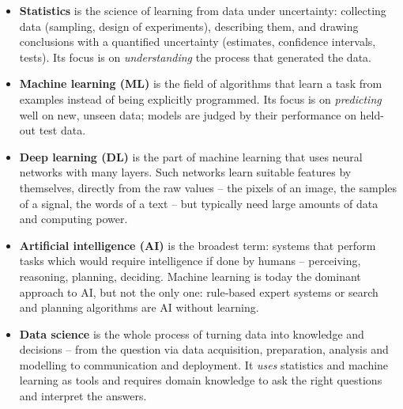 \documentclass[
  letterpaper,
  DIV=11,
  numbers=noendperiod]{scrreprt}
\providecommand{\tightlist}{%
  \setlength{\itemsep}{0pt}\setlength{\parskip}{0pt}}\usepackage{longtable,booktabs,array}
\begin{document}
\begin{tcolorbox}[enhanced jigsaw, left=2mm, title=\textcolor{quarto-callout-note-color}{\faInfo}\hspace{0.5em}{Working definitions used in this course}, opacityback=0, breakable, rightrule=.15mm, arc=.35mm, toptitle=1mm, colbacktitle=quarto-callout-note-color!10!white, opacitybacktitle=0.6, coltitle=black, colframe=quarto-callout-note-color-frame, bottomrule=.15mm, leftrule=.75mm, bottomtitle=1mm, titlerule=0mm, toprule=.15mm, colback=white]

\begin{itemize}
\tightlist
\item
  \textbf{Statistics} is the science of learning from data under
  uncertainty: collecting data (sampling, design of experiments),
  describing them, and drawing conclusions with a quantified uncertainty
  (estimates, confidence intervals, tests). Its focus is on
  \emph{understanding} the process that generated the data.
\item
  \textbf{Machine learning (ML)} is the field of algorithms that learn a
  task from examples instead of being explicitly programmed. Its focus
  is on \emph{predicting} well on new, unseen data; models are judged by
  their performance on held-out test data.
\item
  \textbf{Deep learning (DL)} is the part of machine learning that uses
  neural networks with many layers. Such networks learn suitable
  features by themselves, directly from the raw values -- the pixels of
  an image, the samples of a signal, the words of a text -- but
  typically need large amounts of data and computing power.
\item
  \textbf{Artificial intelligence (AI)} is the broadest term: systems
  that perform tasks which would require intelligence if done by humans
  -- perceiving, reasoning, planning, deciding. Machine learning is
  today the dominant approach to AI, but not the only one: rule-based
  expert systems or search and planning algorithms are AI without
  learning.
\item
  \textbf{Data science} is the whole process of turning data into
  knowledge and decisions -- from the question via data acquisition,
  preparation, analysis and modelling to communication and deployment.
  It \emph{uses} statistics and machine learning as tools and requires
  domain knowledge to ask the right questions and interpret the answers.
\end{itemize}

\end{tcolorbox}
\end{document}
